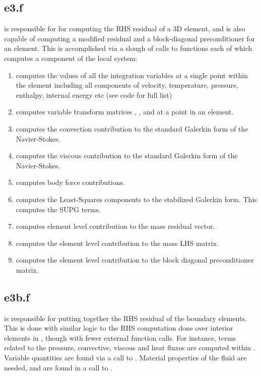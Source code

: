 \documentclass[./]{subfiles}
\begin{document}
\subsection{e3.f }
 is responsible for for computing the RHS residual of a 3D element, and is also capable of computing a modified residual and a block-diagonal preconditioner for an element. This is accomplished via a slough of calls to functions each of which computes a component of the local system:
\begin{enumerate}
\item {} computes the values of all the integration variables at a single point within the element including all components of velocity, temperature, pressure, enthalpy, internal energy etc (see code for full list)
\item {} computes variable transform matrices , ,  and  at a point in an element.
\item {} computes the convection contribution to the standard Galerkin form of the Navier-Stokes. 
\item {} computes the viscous contribution to the standard Galerkin form of the Navier-Stokes.
\item {} computes body force contributions.
\item {} computes the Least-Squares components to the stabilized Galerkin form. This computes the SUPG terms.
\item {} computes element level contribution to the mass residual vector.
\item {} computes the element level contribution to the mass LHS matrix.
\item {} computes the element level contribution to the block diagonal preconditioner matrix.
\end{enumerate}

\subsection{e3b.f }
 is responsible for putting together the RHS residual of the boundary elements. This is done with similar logic to the RHS computation done over interior elements in , though with fewer external function calls. For instance, terms related to the pressure, convective, viscous and heat fluxes are computed within . Variable quantities are found via a call to . Material properties of the fluid are needed, and are found in a call to .
\end{document}
